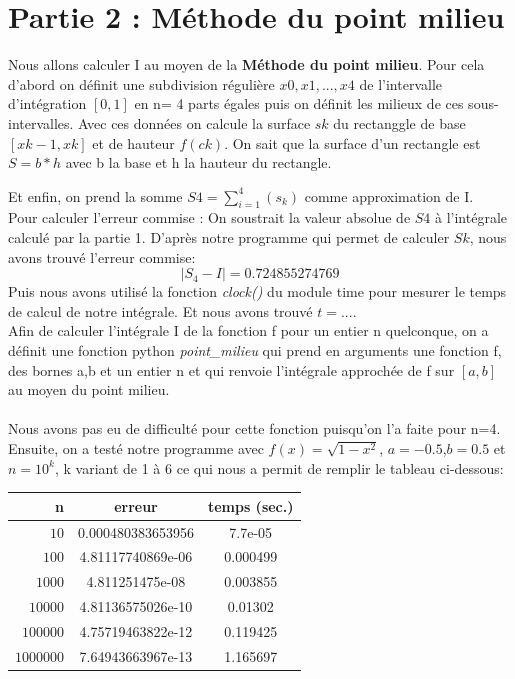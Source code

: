 \documentclass{article}
\begin{document}
\section{Partie 2 : Méthode du point milieu}


	
        Nous allons calculer I au moyen de la \textbf{Méthode du point milieu}. Pour cela d'abord on définit une subdivision régulière $x0,x1,...,x4$ de l'intervalle d'intégration $[0,1]$ en n= 4 parts égales puis on définit les milieux de ces sous-intervalles. Avec ces données on calcule la surface $s{k}$ du rectanggle de base $[x{k-1},x{k}]$ et de hauteur $f(c{k})$. On sait que la surface d'un rectangle est $S= b*h$ avec b la base et h la hauteur du rectangle.
	

	Et enfin, on prend la somme $S{4}=\sum_{i=1}^{4} (s_{k})$ comme approximation de I. 
\newline
	\\	Pour calculer l'erreur commise : On soustrait la valeur absolue de $S{4}$ à l'intégrale calculé par la partie 1.
D'après notre programme qui permet de calculer $S{k}$, nous avons trouvé l'erreur commise: $$\vert S_4 - I \vert = 0.724855274769$$
\newline
         Puis nous avons utilisé la fonction \textit {clock()} du module time pour mesurer le temps de calcul de notre intégrale.
Et nous avons trouvé $t= ...$.
\newline
\\

	Afin de calculer l'intégrale I de la fonction f pour un entier n quelconque, on a définit une fonction python \textit{point\_milieu} qui prend en arguments une fonction f, des bornes a,b et un entier n et qui renvoie l'intégrale approchée de f sur $[a,b]$ au moyen du point milieu. 
	\\
\\
	Nous avons pas eu de difficulté pour cette fonction puisqu'on l'a faite pour n=4.
\\
Ensuite, on a testé notre programme avec $f(x)= \sqrt{1 - x^2}$, $a=-0.5 $,$b=0.5$ et $ n=10^{k}$, k variant de 1 à 6 ce qui nous a permit de remplir le tableau ci-dessous:
\\

\begin{center}
\begin{tabular}{r | c | c}
{n} & erreur & temps (sec.)\\
\hline
$10$ & {0.000480383653956} & {7.7e-05}\\
$100$ & {4.81117740869e-06} & {0.000499}\\
$1000$ & {4.811251475e-08} & {0.003855}\\
$10000$ & {4.81136575026e-10} & {0.01302}\\
$100000$ & {4.75719463822e-12} & {0.119425}\\
$1000000$ & {7.64943663967e-13} & {1.165697}
\end{tabular}
\end{center}
\end{document}

